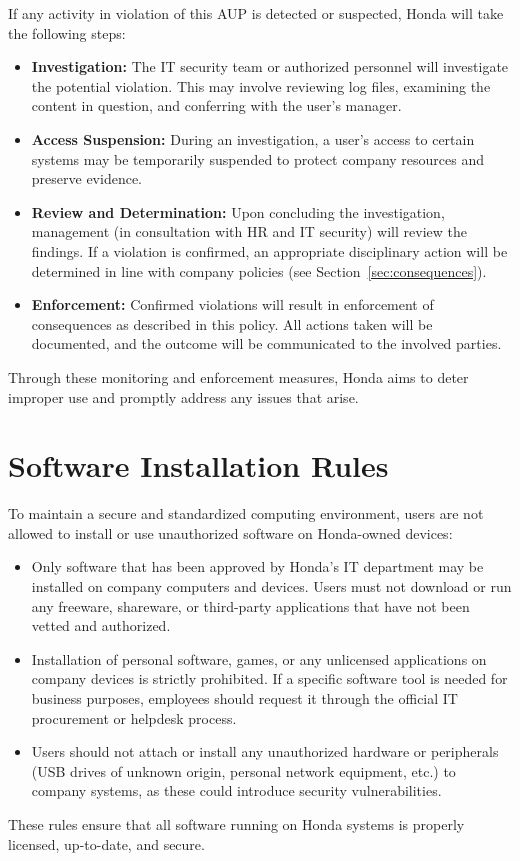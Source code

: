 If any activity in violation of this AUP is detected or suspected, Honda will take the following steps:
\begin{itemize}
    \item \textbf{Investigation:} The IT security team or authorized personnel will investigate the potential violation. This may involve reviewing log files, examining the content in question, and conferring with the user's manager.
    \item \textbf{Access Suspension:} During an investigation, a user's access to certain systems may be temporarily suspended to protect company resources and preserve evidence.
    \item \textbf{Review and Determination:} Upon concluding the investigation, management (in consultation with HR and IT security) will review the findings. If a violation is confirmed, an appropriate disciplinary action will be determined in line with company policies (see Section~\ref{sec:consequences}).
    \item \textbf{Enforcement:} Confirmed violations will result in enforcement of consequences as described in this policy. All actions taken will be documented, and the outcome will be communicated to the involved parties.
\end{itemize}
Through these monitoring and enforcement measures, Honda aims to deter improper use and promptly address any issues that arise.

\section{Software Installation Rules}
To maintain a secure and standardized computing environment, users are not allowed to install or use unauthorized software on Honda-owned devices:
\begin{itemize}
    \item Only software that has been approved by Honda's IT department may be installed on company computers and devices. Users must not download or run any freeware, shareware, or third-party applications that have not been vetted and authorized.
    \item Installation of personal software, games, or any unlicensed applications on company devices is strictly prohibited. If a specific software tool is needed for business purposes, employees should request it through the official IT procurement or helpdesk process.
    \item Users should not attach or install any unauthorized hardware or peripherals (USB drives of unknown origin, personal network equipment, etc.) to company systems, as these could introduce security vulnerabilities.
\end{itemize}
These rules ensure that all software running on Honda systems is properly licensed, up-to-date, and secure.

